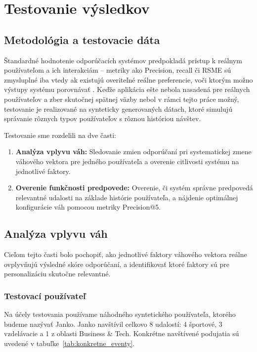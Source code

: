 \section{Testovanie výsledkov}

\subsection{Metodológia a testovacie dáta}

Štandardné hodnotenie odporúčacích systémov predpokladá prístup k reálnym používateľom a ich interakciám --
metriky ako Precision, recall či RSME sú zmysluplné iba vtedy
ak existujú overiteľné reálne preferencie, voči ktorým možno výstupy systému porovnávať \cite{ko2022survey}.
Keďže aplikácia ešte nebola nasadená pre reálnych používateľov a zber skutočnej spätnej väzby nebol v rámci tejto práce možný,
testovanie je realizované na synteticky generovaných dátach, ktoré simulujú správanie rôznych typov používateľov s rôznou históriou návštev.


Testovanie sme rozdelili na dve časti:
\begin{enumerate}
    \item \textbf{Analýza vplyvu váh:} Sledovanie zmien odporúčaní pri systematickej
    zmene váhového vektora pre jedného používateľa a overenie citlivosti systému
    na jednotlivé faktory.
    \item \textbf{Overenie funkčnosti predpovede:} Overenie, či systém správne
    predpovedá relevantné udalosti na základe histórie používateľa, a nájdenie
    optimálnej konfigurácie váh pomocou metriky Precision@5.
\end{enumerate}


\subsection{Analýza vplyvu váh}
Cieľom tejto časti bolo pochopiť, ako jednotlivé faktory váhového vektora reálne
ovplyvňujú výsledné skóre odporúčaní, a identifikovať ktoré faktory sú pre
personalizáciu skutočne relevantné.

\subsubsection{Testovací používateľ}
Na účely testovania používame náhodného syntetického používateľa, ktorého budeme
nazývať Janko. Janko navštívil celkovo 8 udalostí: 4 športové, 3 vzdelávacie
a 1 z oblasti Business \& Tech. Konkrétne navštívené podujatia sú uvedené
v tabuľke~\ref{tab:konkretne_eventy}.

